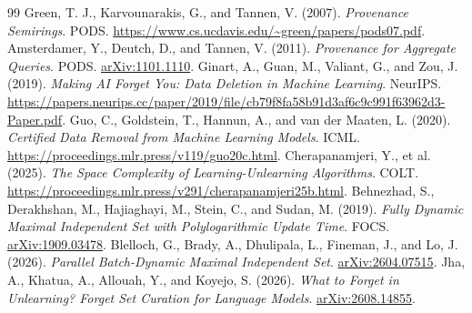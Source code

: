 \documentclass[11pt,a4paper]{article}
\theoremstyle{definition}\newtheorem{definition}[theorem]{Definition}
\begin{document}
\begin{thebibliography}{99}
 Green, T. J., Karvounarakis, G., and Tannen, V. (2007). \emph{Provenance Semirings}. PODS. \url{https://www.cs.ucdavis.edu/~green/papers/pods07.pdf}.
 Amsterdamer, Y., Deutch, D., and Tannen, V. (2011). \emph{Provenance for Aggregate Queries}. PODS. \href{https://arxiv.org/abs/1101.1110}{arXiv:1101.1110}.
 Ginart, A., Guan, M., Valiant, G., and Zou, J. (2019). \emph{Making AI Forget You: Data Deletion in Machine Learning}. NeurIPS. \url{https://papers.neurips.cc/paper/2019/file/cb79f8fa58b91d3af6c9c991f63962d3-Paper.pdf}.
 Guo, C., Goldstein, T., Hannun, A., and van der Maaten, L. (2020). \emph{Certified Data Removal from Machine Learning Models}. ICML. \url{https://proceedings.mlr.press/v119/guo20c.html}.
 Cherapanamjeri, Y., et al. (2025). \emph{The Space Complexity of Learning-Unlearning Algorithms}. COLT. \url{https://proceedings.mlr.press/v291/cherapanamjeri25b.html}.
 Behnezhad, S., Derakhshan, M., Hajiaghayi, M., Stein, C., and Sudan, M. (2019). \emph{Fully Dynamic Maximal Independent Set with Polylogarithmic Update Time}. FOCS. \href{https://arxiv.org/abs/1909.03478}{arXiv:1909.03478}.
 Blelloch, G., Brady, A., Dhulipala, L., Fineman, J., and Lo, J. (2026). \emph{Parallel Batch-Dynamic Maximal Independent Set}. \href{https://arxiv.org/abs/2604.07515}{arXiv:2604.07515}.
 Jha, A., Khatua, A., Allouah, Y., and Koyejo, S. (2026). \emph{What to Forget in Unlearning? Forget Set Curation for Language Models}. \href{https://arxiv.org/abs/2608.14855}{arXiv:2608.14855}.
\end{thebibliography}
\end{document}
